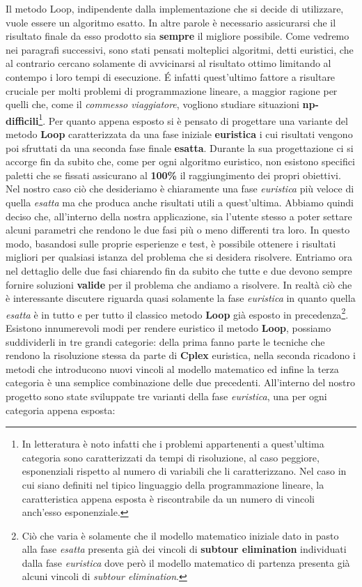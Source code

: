 \documentclass[11pt]{article}
\begin{document}
Il metodo Loop, indipendente dalla implementazione che si decide di utilizzare, vuole essere un algoritmo esatto. In altre parole è necessario assicurarsi che il risultato finale da esso prodotto sia \textbf{sempre} il migliore possibile. Come vedremo nei paragrafi successivi, sono stati pensati molteplici algoritmi, detti euristici, che al contrario cercano solamente di avvicinarsi al risultato ottimo limitando al contempo i loro tempi di esecuzione.
\'E infatti quest'ultimo fattore a risultare cruciale per molti problemi di programmazione lineare, a maggior ragione per quelli che, come il \textit{commesso viaggiatore}, vogliono studiare situazioni \textbf{np-difficili}\footnote{In letteratura è noto infatti che i problemi appartenenti a quest'ultima categoria sono caratterizzati da tempi di risoluzione, al caso peggiore, esponenziali rispetto al numero di variabili che li caratterizzano. Nel caso in cui siano definiti nel tipico linguaggio della programmazione lineare, la caratteristica appena esposta è riscontrabile da un numero di vincoli anch'esso esponenziale.}.
Per quanto appena esposto si è pensato di progettare una variante del metodo \textbf{Loop} caratterizzata da una fase iniziale \textbf{euristica} i cui risultati vengono poi sfruttati da una seconda fase finale \textbf{esatta}. Durante la sua progettazione ci si accorge fin da subito che, come per ogni algoritmo euristico, non esistono specifici paletti che se fissati assicurano al \textbf{100\%} il raggiungimento dei propri obiettivi. Nel nostro caso ciò che desideriamo è chiaramente una fase \textit{euristica} più veloce di quella \textit{esatta} ma che produca anche risultati utili a quest'ultima. Abbiamo quindi deciso che, all'interno della nostra applicazione, sia l'utente stesso a poter settare alcuni parametri che rendono le due fasi più o meno differenti tra loro. In questo modo, basandosi sulle proprie esperienze e test, è possibile ottenere i risultati migliori per qualsiasi istanza del problema che si desidera risolvere.
Entriamo ora nel dettaglio delle due fasi chiarendo fin da subito che tutte e due devono sempre fornire soluzioni \textbf{valide} per il problema che andiamo a risolvere. In realtà ciò che è interessante discutere riguarda quasi solamente la fase \textit{euristica} in quanto quella \textit{esatta} è in tutto e per tutto il classico metodo \textbf{Loop} già esposto in precedenza\footnote{Ciò che varia è solamente che il modello matematico iniziale dato in pasto alla fase \textit{esatta} presenta già dei vincoli di \textbf{subtour elimination} individuati dalla fase \textit{euristica} dove però il modello matematico di partenza presenta già alcuni vincoli di \textit{subtour elimination}.}.
Esistono innumerevoli modi per rendere euristico il metodo \textbf{Loop}, possiamo suddividerli in tre grandi categorie: della prima fanno parte le tecniche che rendono la risoluzione stessa da parte di \textbf{Cplex} euristica, nella seconda ricadono i metodi che introducono nuovi vincoli al modello matematico ed infine la terza categoria è una semplice combinazione delle due precedenti. All'interno del nostro progetto sono state sviluppate tre varianti della fase \textit{euristica}, una per ogni categoria appena esposta:
\end{document}
